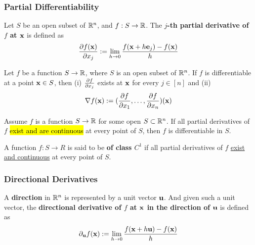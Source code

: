 \documentclass[11pt]{article}
\begin{document}
			\subsubsection{Partial Differentiability}
				\begin{definition}
					Let $S$ be an open subset of $\mathbb{R}^n$, and $f: S \to \mathbb{R}$. The \textbf{$j$-th partial derivative of $f$ at $\textbf{x}$} is defined as 
					\begin{equation}
						\frac{\partial{f(\textbf{x})}}{\partial{x_j}} := \lim_{h \to 0} \frac{f(\textbf{x} + h \textbf{e}_j) - f(\textbf{x})}{h}
					\end{equation}
				\end{definition}
				
				\begin{theorem}
					Let $f$ be a function $S \to \mathbb{R}$, where $S$ is an open subset of $\mathbb{R}^n$. If $f$ is differentiable at a point $\textbf{x} \in S$, then (i) $\frac{\partial{f}}{\partial{x_j}}$ exists at $\textbf{x}$ for every $j \in [n]$ and (ii) 
					\begin{equation}
						\nabla f(\textbf{x}) := (\frac{\partial{f}}{\partial{x_1}}, \dots, \frac{\partial{f}}{\partial{x_n}})(\textbf{x})
					\end{equation}
				\end{theorem}
				
				\begin{theorem}
					Assume $f$ is a function $S \to \mathbb{R}$ for some open $S \subset \mathbb{R}^n$. If all partial derivatives of $f$ \hl{exist and are continuous} at every point of $S$, then $f$ is differentiable in $S$.
				\end{theorem}
				
				\begin{definition}
					A function $f: S \to R$ is said to be \textbf{of class $C^1$} if all partial derivatives of $f$ \ul{exist and continuous} at every point of $S$.
				\end{definition}
								
			\subsubsection{Directional Derivatives}
				\begin{definition}
					A \textbf{direction} in $\mathbb{R}^n$ is represented by a unit vector $\textbf{u}$. And given such a unit vector, the \textbf{directional derivative of $f$ at $\textbf{x}$ in the direction of $\textbf{u}$} is defined as
					\begin{equation}
						\partial_{\textbf{u}} f(\textbf{x}) := \lim_{h \to 0} \frac{f(\textbf{x} + h \textbf{u}) - f(\textbf{x})}{h}
					\end{equation}
				\end{definition}
				
\end{document}
